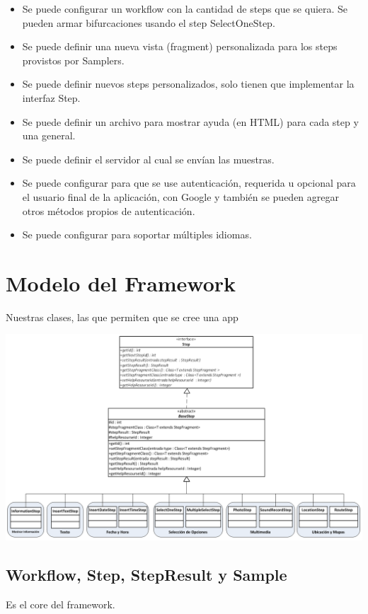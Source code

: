 \begin{itemize}
	\item Se puede configurar un workflow con la cantidad de steps que se quiera. Se pueden armar bifurcaciones usando el step SelectOneStep.
	\item Se puede definir una nueva vista (fragment) personalizada para los steps provistos por Samplers.
	\item Se puede definir nuevos steps personalizados, solo tienen que implementar la interfaz Step.
	\item Se puede definir un archivo para mostrar ayuda (en HTML) para cada step y una general.
	\item Se puede definir el servidor al cual se envían las muestras.
	\item Se puede configurar para que se use autenticación, requerida u opcional para el usuario final de la aplicación, con Google y también se pueden agregar otros métodos propios de autenticación.
	\item Se puede configurar para soportar múltiples idiomas.
\end{itemize}





\section{Modelo del Framework}
Nuestras clases, las que permiten que se cree una app

\includegraphics[scale=0.4]{05-implementacion/Steps.png} 

\subsection{Workflow, Step, StepResult y Sample}
Es el core del framework.

